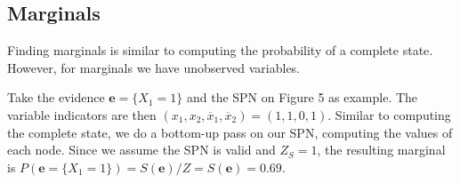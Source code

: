 \documentclass[a4paper,10pt]{article}
\theoremstyle{plain}
\begin{document}
\begin{figure}[h]
\end{figure}

\subsection{Marginals}

Finding marginals is similar to computing the probability of a complete state. However, for
marginals we have unobserved variables.

Take the evidence $\mathbf{e}=\{X_1=1\}$ and the SPN on Figure 5 as example. The variable
indicators are then $(x_1,x_2,\overline{x}_1,\overline{x}_2)=(1,1,0,1)$. Similar to computing the
complete state, we do a bottom-up pass on our SPN, computing the values of each node. Since we
assume the SPN is valid and $Z_S=1$, the resulting marginal is $P(\mathbf{e}=\{X_1=1\})=
S(\mathbf{e})/Z=S(\mathbf{e})=0.69$.
\end{document}
